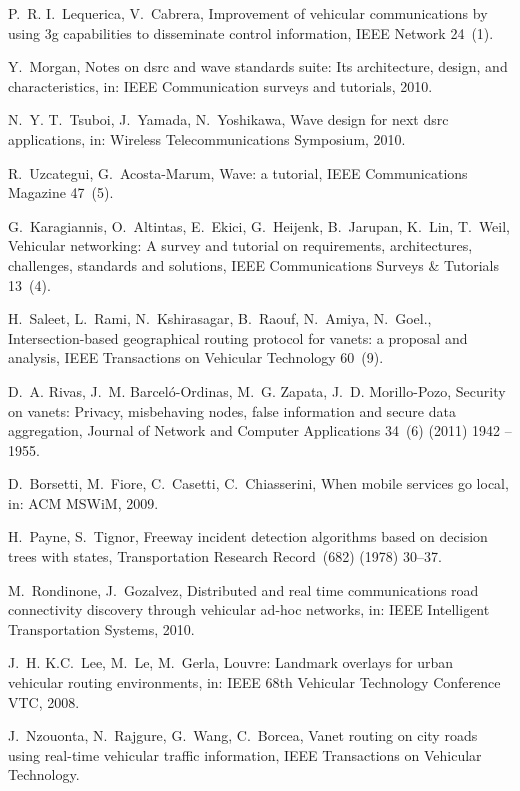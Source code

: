 \documentclass[10pt,onecolumn]{article}
\begin{document}
\begin{thebibliography}{00}
P.~R. I.~Lequerica, V.~Cabrera, Improvement of vehicular communications by
  using 3g capabilities to disseminate control information, IEEE Network
  24~(1).

Y.~Morgan, Notes on dsrc and wave standards suite: Its architecture, design,
  and characteristics, in: IEEE Communication surveys and tutorials, 2010.

N.~Y. T.~Tsuboi, J.~Yamada, N.~Yoshikawa, Wave design for next dsrc
  applications, in: Wireless Telecommunications Symposium, 2010.

R.~Uzcategui, G.~Acosta-Marum, Wave: a tutorial, IEEE Communications Magazine
  47~(5).

G.~Karagiannis, O.~Altintas, E.~Ekici, G.~Heijenk, B.~Jarupan, K.~Lin, T.~Weil,
  Vehicular networking: A survey and tutorial on requirements, architectures,
  challenges, standards and solutions, IEEE Communications Surveys \& Tutorials
  13~(4).

H.~Saleet, L.~Rami, N.~Kshirasagar, B.~Raouf, N.~Amiya, N.~Goel.,
  Intersection-based geographical routing protocol for vanets: a proposal and
  analysis, IEEE Transactions on Vehicular Technology 60~(9).

D.~A. Rivas, J.~M. Barceló-Ordinas, M.~G. Zapata, J.~D. Morillo-Pozo, Security
  on vanets: Privacy, misbehaving nodes, false information and secure data
  aggregation, Journal of Network and Computer Applications 34~(6) (2011) 1942
  -- 1955.

D.~Borsetti, M.~Fiore, C.~Casetti, C.~Chiasserini, When mobile services go
  local, in: ACM MSWiM, 2009.

H.~Payne, S.~Tignor, Freeway incident detection algorithms based on decision
  trees with states, Transportation Research Record~(682) (1978) 30--37.

M.~Rondinone, J.~Gozalvez, Distributed and real time communications road
  connectivity discovery through vehicular ad-hoc networks, in: IEEE
  Intelligent Transportation Systems, 2010.

J.~H. K.C.~Lee, M.~Le, M.~Gerla, Louvre: Landmark overlays for urban vehicular
  routing environments, in: IEEE 68th Vehicular Technology Conference VTC,
  2008.

J.~Nzouonta, N.~Rajgure, G.~Wang, C.~Borcea, Vanet routing on city roads using
  real-time vehicular traffic information, IEEE Transactions on Vehicular
  Technology.


\end{thebibliography}
\end{document}
